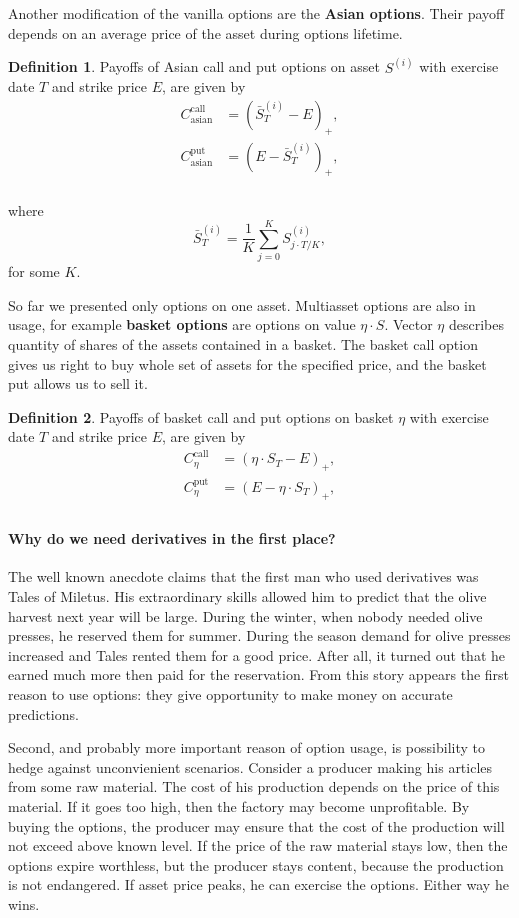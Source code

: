 \documentclass[a4paper,12pt, oneside]{book}
\theoremstyle{definition}
\newtheorem{mydef}{Definition}[chapter]
\theoremstyle{remark}
\begin{document}
Another modification of the vanilla options are the \textbf{Asian options}. Their payoff depends on an average price of the asset during options lifetime.
\begin{mydef}
 Payoffs of Asian call and put options on asset $S^{(i)}$ with exercise date $T$ and strike price $E$, are given by
\begin{align*}
 C^{\text{call}}_{\text{asian}} &= (\bar{S}^{(i)}_T - E)_+, \\
 C^{\text{put}}_{\text{asian}} &= (E - \bar{S}^{(i)}_T)_+, \\
\end{align*}
\end{mydef}
\noindent where
\[ \bar{S}^{(i)}_T = \frac{1}{K} \sum\limits_{j=0}^K S^{(i)}_{j\cdot T/K}, \]
for some $K$. 

So far we presented only options on one asset. Multiasset options are also in usage, for example \textbf{basket options} are options on value $\eta \cdot S$. Vector $\eta$ describes quantity of shares of the assets contained in a basket. The basket call option gives us right to buy whole set of assets for the specified price, and the basket put allows us to sell it.
\begin{mydef}
 Payoffs of basket call and put options on basket $\eta$ with exercise date $T$ and strike price $E$, are given by
\begin{align*}
 C^{\text{call}}_{\eta} &= (\eta \cdot S_T - E)_+, \\
 C^{\text{put}}_{\eta} &= (E - \eta \cdot S_T)_+, \\
\end{align*}
\end{mydef}

\paragraph{Why do we need derivatives in the first place?}
The well known anecdote claims that the first man who used derivatives was Tales of Miletus. His extraordinary skills allowed him to predict that the olive harvest next year will be large. During the winter, when nobody needed olive presses, he reserved them for summer. During the season demand for olive presses increased and Tales rented them for a good price. After all, it turned out that he earned much more then paid for the reservation. From this story appears the first reason to use options: they give opportunity to make money on accurate predictions.

Second, and probably more important reason of option usage, is possibility to hedge against unconvienient scenarios. Consider a producer making his articles from some raw material. The cost of his production depends on the price of this material. If it goes too high, then the factory may become unprofitable. By buying the options, the producer may ensure that the cost of the production will not exceed above known level. If the price of the raw material stays low, then the options expire worthless, but the producer stays content, because the production is not endangered. If asset price peaks, he can exercise the options. Either way he wins.
\end{document}
